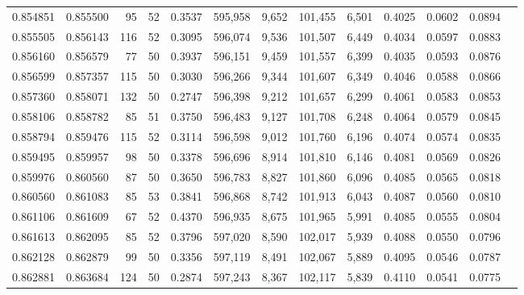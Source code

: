 \begin{tabular}{rrrrrrrrrrrrr}
0.854851 & 0.855500 &    95 &  52 &                                     0.3537 & 595,958 &   9,652 & 101,455 &   6,501 & 0.4025 & 0.0602 & 0.0894 \\
0.855505 & 0.856143 &   116 &  52 &                                     0.3095 & 596,074 &   9,536 & 101,507 &   6,449 & 0.4034 & 0.0597 & 0.0883 \\
0.856160 & 0.856579 &    77 &  50 &                                     0.3937 & 596,151 &   9,459 & 101,557 &   6,399 & 0.4035 & 0.0593 & 0.0876 \\
0.856599 & 0.857357 &   115 &  50 &                                     0.3030 & 596,266 &   9,344 & 101,607 &   6,349 & 0.4046 & 0.0588 & 0.0866 \\
0.857360 & 0.858071 &   132 &  50 &                                     0.2747 & 596,398 &   9,212 & 101,657 &   6,299 & 0.4061 & 0.0583 & 0.0853 \\
0.858106 & 0.858782 &    85 &  51 &                                     0.3750 & 596,483 &   9,127 & 101,708 &   6,248 & 0.4064 & 0.0579 & 0.0845 \\
0.858794 & 0.859476 &   115 &  52 &                                     0.3114 & 596,598 &   9,012 & 101,760 &   6,196 & 0.4074 & 0.0574 & 0.0835 \\
0.859495 & 0.859957 &    98 &  50 &                                     0.3378 & 596,696 &   8,914 & 101,810 &   6,146 & 0.4081 & 0.0569 & 0.0826 \\
0.859976 & 0.860560 &    87 &  50 &                                     0.3650 & 596,783 &   8,827 & 101,860 &   6,096 & 0.4085 & 0.0565 & 0.0818 \\
0.860560 & 0.861083 &    85 &  53 &                                     0.3841 & 596,868 &   8,742 & 101,913 &   6,043 & 0.4087 & 0.0560 & 0.0810 \\
0.861106 & 0.861609 &    67 &  52 &                                     0.4370 & 596,935 &   8,675 & 101,965 &   5,991 & 0.4085 & 0.0555 & 0.0804 \\
0.861613 & 0.862095 &    85 &  52 &                                     0.3796 & 597,020 &   8,590 & 102,017 &   5,939 & 0.4088 & 0.0550 & 0.0796 \\
0.862128 & 0.862879 &    99 &  50 &                                     0.3356 & 597,119 &   8,491 & 102,067 &   5,889 & 0.4095 & 0.0546 & 0.0787 \\
0.862881 & 0.863684 &   124 &  50 &                                     0.2874 & 597,243 &   8,367 & 102,117 &   5,839 & 0.4110 & 0.0541 & 0.0775 \\

\end{tabular}
